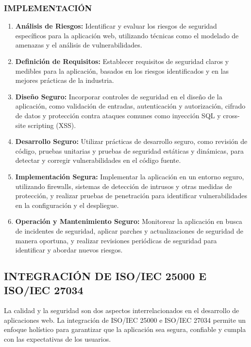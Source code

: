 \subsubsection{IMPLEMENTACIÓN}

\begin{enumerate}
    \item \textbf{Análisis de Riesgos:} Identificar y evaluar los riesgos de seguridad específicos para la aplicación web, utilizando técnicas como el modelado de amenazas y el análisis de vulnerabilidades.
    \item \textbf{Definición de Requisitos:} Establecer requisitos de seguridad claros y medibles para la aplicación, basados en los riesgos identificados y en las mejores prácticas de la industria.
    \item \textbf{Diseño Seguro:} Incorporar controles de seguridad en el diseño de la aplicación, como validación de entradas, autenticación y autorización, cifrado de datos y protección contra ataques comunes como inyección SQL y cross-site scripting (XSS).
    \item \textbf{Desarrollo Seguro:} Utilizar prácticas de desarrollo seguro, como revisión de código, pruebas unitarias y pruebas de seguridad estáticas y dinámicas, para detectar y corregir vulnerabilidades en el código fuente.
    \item \textbf{Implementación Segura:} Implementar la aplicación en un entorno seguro, utilizando firewalls, sistemas de detección de intrusos y otras medidas de protección, y realizar pruebas de penetración para identificar vulnerabilidades en la configuración y el despliegue.
    \item \textbf{Operación y Mantenimiento Seguro:} Monitorear la aplicación en busca de incidentes de seguridad, aplicar parches y actualizaciones de seguridad de manera oportuna, y realizar revisiones periódicas de seguridad para identificar y abordar nuevos riesgos.
\end{enumerate}

\subsection{INTEGRACIÓN DE ISO/IEC 25000 E ISO/IEC 27034}

La calidad y la seguridad son dos aspectos interrelacionados en el desarrollo de aplicaciones web. La integración de ISO/IEC 25000 e ISO/IEC 27034 permite un enfoque holístico para garantizar que la aplicación sea segura, confiable y cumpla con las expectativas de los usuarios.

